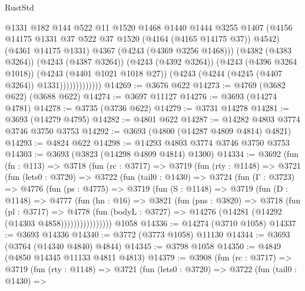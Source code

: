\begin{lexlean}{RustStd}
\begin{coremodule}
                            @1331
                            @182
                            @144
                            @522
                            @11
                            @1520
                            @1468
                            @1440
                            @1444
                            @3255
                            @1407
                            (@4156 @14175 @1331 @37 @522 @37 @1520 (@4164 (@4165 @14175 @37)) @4542)
                            (@4361 @14175 @1331)
                            @4367
                            (@4243 (@4369 @3256 @1468)))
                          (@4382 (@4383 @3264))
                          (@4243 (@4387 @3264))
                          (@4243 (@4392 @3264))
                          (@4243 (@4396 @3264 @1018))
                          (@4243 (@4401 @1021 @1018 @27))
                          (@4243 (@4244 (@4245 (@4407 @3264)) @1331)))))))))))))
@14269 := @3676 @622
@14273 := @4769 (@3682 @622) (@3688 @622)
@14274 := @3697 @11127
@14276 := @3693 (@14274 @4781)
@14278 := @3735 (@3736 @622)
@14279 := @3731 @14278
@14281 := @3693 (@14279 @4795)
@14282 := @4801 @622
@14287 := @14282 @4803 @3774 @3746 @3750 @3753
@14292 := @3693 (@4800 (@14287 @4809 @4814) @4821)
@14293 := @4824 @622
@14298 := @14293 @4803 @3774 @3746 @3750 @3753
@14303 := @3693 (@3823 (@14298 @4809 @4814) @1300)
@14334 := @3692
    (fun (fn : @113) =>
    @3718
      (fun (rc : @3717) =>
      @3719
        (fun (rty : @1148) =>
        @3721
          (fun (lets0 : @3720) =>
          @3722
            (fun (tail0 : @1430) =>
            @3724
              (fun (Γ : @3723) =>
              @4776
                (fun (ps : @4775) =>
                @3719
                  (fun (S : @1148) =>
                  @3719
                    (fun (D : @1148) =>
                    @4777
                      (fun (hn : @16) =>
                      @3821
                        (fun (pns : @3820) =>
                        @3718
                          (fun (pl : @3717) =>
                          @4778
                            (fun (bodyL : @3727) =>
                            @14276 (@14281 (@14292 (@14303 @4858))))))))))))))))
    @1058
@14336 := @14274 (@3710 @1058)
@14337 := @3693 @14336
@14340 := @3772 (@3773 @1058) @11130
@14344 := @3693 (@3764 (@14340 @4840) @4844)
@14345 := @3798 @1058
@14350 := @4849 (@4850 @14345 @11133 @4811 @4813)
@14379 := @3908
    (fun (rc : @3717) =>
    @3719
      (fun (rty : @1148) =>
      @3721
        (fun (lets0 : @3720) =>
        @3722
          (fun (tail0 : @1430) =>

\end{coremodule}
\end{lexlean}
